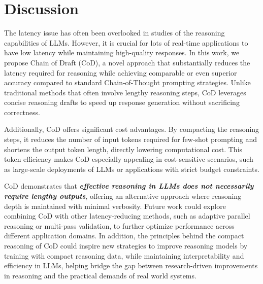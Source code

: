 \section{Discussion}
The latency issue has often been overlooked in studies of the reasoning capabilities of LLMs. 
However, it is crucial for lots of real-time applications to have low latency while maintaining high-quality responses. 
In this work, we propose Chain of Draft (CoD), a novel approach that substantially reduces the latency required for reasoning while achieving comparable or even superior accuracy compared to standard Chain-of-Thought prompting strategies. Unlike traditional methods that often involve lengthy reasoning steps, CoD leverages concise reasoning drafts to speed up response generation without sacrificing correctness.

Additionally, CoD offers significant cost advantages. By compacting the reasoning steps, it reduces the number of input tokens required for few-shot prompting and shortens the output token length, directly lowering computational cost. This token efficiency makes CoD especially appealing in cost-sensitive scenarios, such as large-scale deployments of LLMs or applications with strict budget constraints.

CoD demonstrates that {\bf\em effective reasoning in LLMs does not necessarily require lengthy outputs}, offering an alternative approach where reasoning depth is maintained with minimal verbosity. 
Future work could explore combining CoD with other latency-reducing methods, such as adaptive parallel reasoning or multi-pass validation, to further optimize performance across different application domains. In addition, the principles behind the compact reasoning of CoD could inspire new strategies to improve reasoning models by training with compact reasoning data, while maintaining interpretability and efficiency in LLMs, helping bridge the gap between research-driven improvements in reasoning and the practical demands of real world systems.